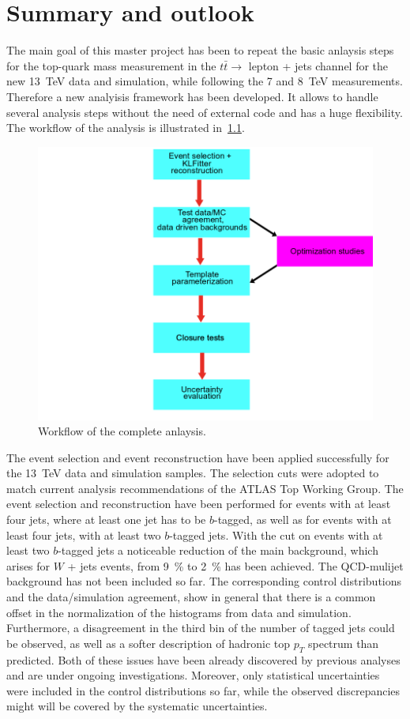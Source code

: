 \chapter{Summary and outlook}
\label{sec:sum}

The main goal of this master project has been to repeat the basic anlaysis steps for the top-quark mass measurement in the $t\bar{t} \rightarrow $ lepton + jets channel for the new 13~TeV data and simulation, while following the  7 and 8~TeV measurements. Therefore a new analyisis framework has been developed. It allows to handle several analysis steps without the need of external code and has a huge flexibility. The workflow of the analysis is illustrated in~\cref{fig:Workflow}.

\begin{figure}
	\center
	\includegraphics[width=0.6\linewidth]{Pics/Workflow}
	\caption{Workflow of the complete anlaysis.} \label{fig:Workflow}
\end{figure}

 The event selection and event reconstruction have been applied successfully for the 13~TeV data and simulation samples. The selection cuts were adopted to match current analysis recommendations of the ATLAS Top Working Group. The event selection and reconstruction have been performed for events with at least four jets, where at least one jet has to be $b$-tagged, as well as for events with at least four jets, with  at least two $b$-tagged jets.  With the cut on events with at least two $b$-tagged jets a noticeable reduction of the main background, which arises for $W$  + jets events, from 9~\% to 2~\% has been  achieved. The QCD-mulijet background has not been included so far. The corresponding control distributions and  the data/simulation agreement, show in general that there is a common offset in the normalization of the histograms from data and simulation. Furthermore, a disagreement  in the third bin of the number of tagged jets could be observed, as well as a softer description of hadronic top $p_T$ spectrum than predicted. Both of these issues have been already discovered by previous analyses and are under ongoing investigations. Moreover, only statistical uncertainties were included in the control distributions so far, while the observed discrepancies might will be covered by the systematic uncertainties.
 

